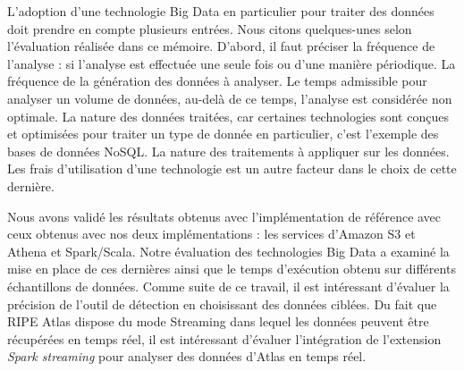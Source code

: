 L'adoption d'une technologie Big Data en particulier pour traiter des données  doit prendre en compte plusieurs entrées. Nous citons quelques-unes selon l'évaluation réalisée dans ce mémoire. D'abord, il faut préciser la fréquence de l'analyse : si l'analyse est effectuée une seule fois ou d'une manière périodique. La fréquence de la génération des données à analyser.   Le temps admissible pour analyser un volume de données, au-delà de ce temps, l'analyse est considérée non optimale. 
La nature des données traitées, car certaines technologies sont conçues  et optimisées pour traiter un type de donnée en particulier, c'est l'exemple des bases de données NoSQL. La nature des traitements à appliquer sur les données. Les frais d'utilisation d'une technologie est un autre facteur dans le choix de cette dernière. 




Nous avons validé les résultats obtenus   avec  l'implémentation de référence avec ceux obtenus avec nos deux implémentations : les services d'Amazon S3 et Athena et  Spark/Scala. Notre évaluation des technologies Big Data a examiné la mise en place de ces dernières ainsi que  le temps d'exécution obtenu sur différents échantillons de données.  Comme  suite de ce travail, il est intéressant d'évaluer la précision de l'outil de détection  en choisissant des données ciblées.
Du fait que RIPE Atlas dispose du mode Streaming dans lequel les données peuvent être récupérées en temps réel, il est intéressant d'évaluer l'intégration de l'extension \textit{Spark streaming} pour analyser des données  d'Atlas en temps réel.  



 






























